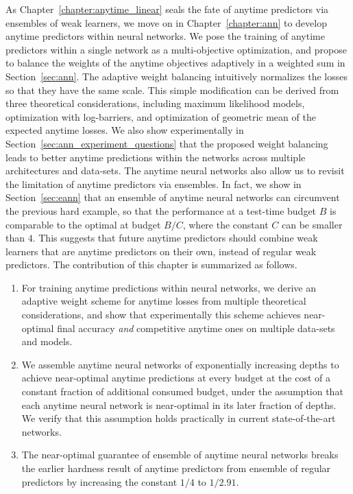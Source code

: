As Chapter~\ref{chapter:anytime_linear} seals the fate of anytime predictors via ensembles of weak learners, we move on in Chapter~\ref{chapter:ann} to develop anytime predictors within neural networks. We pose the training of anytime predictors within a single network as a multi-objective optimization, and propose to balance the weights of the anytime objectives adaptively in a weighted sum in Section~\ref{sec:ann}. The adaptive weight balancing intuitively normalizes the losses so that they have the same scale. This simple modification can be derived from three theoretical considerations, including maximum likelihood models, optimization with log-barriers, and optimization of geometric mean of the expected anytime losses. We also show experimentally in Section~\ref{sec:ann_experiment_questions} that the proposed weight balancing leads to better anytime predictions within the networks across multiple architectures and data-sets. The anytime neural networks also allow us to revisit the limitation of anytime predictors via ensembles. In fact, we show in Section~\ref{sec:eann} that an ensemble of anytime neural networks can circumvent the previous hard example, so that the performance at a test-time budget $B$ is comparable to the optimal at budget $B/C$, where the constant $C$ can be smaller than $4$. This suggests that future anytime predictors should combine weak learners that are anytime predictors on their own, instead of regular weak predictors.
The contribution of this chapter is summarized as follows.

\begin{enumerate}[resume]
\item For training anytime predictions within neural networks, we derive an adaptive weight scheme for anytime losses from multiple theoretical considerations, and show that experimentally this scheme achieves near-optimal final accuracy \emph{and} competitive anytime ones on multiple data-sets and models.
\item We assemble anytime neural networks of exponentially increasing depths to achieve near-optimal anytime predictions at every budget at the cost of a constant fraction of additional consumed budget, under the assumption that each anytime neural network is near-optimal in its later fraction of depths. We verify that this assumption holds practically in current state-of-the-art networks.
\item The near-optimal guarantee of ensemble of anytime neural networks breaks the earlier hardness result of anytime predictors from ensemble of regular predictors by increasing the constant $1/4$ to $1/2.91$.
\end{enumerate}

